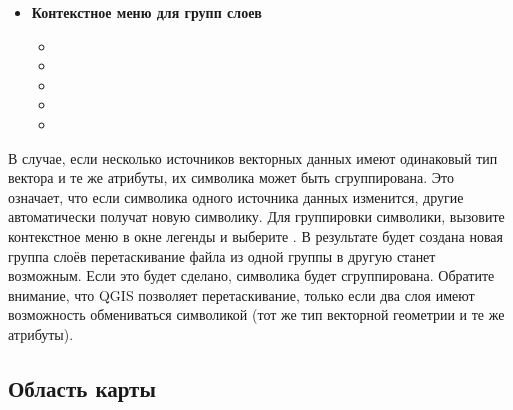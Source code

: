 \begin{itemize}
\item \textbf{Контекстное меню для групп слоев}
\begin{itemize}
\item {}
\item {}
\item {}
\item {}
\item {}
\end{itemize}

\end{itemize}

В случае, если несколько источников векторных данных имеют одинаковый
тип вектора и те же атрибуты, их символика может быть сгруппирована.
Это означает, что если символика одного источника данных изменится,
другие автоматически получат новую символику. Для группировки символики,
вызовите контекстное меню в окне легенды и выберите
. В результате будет создана новая группа слоёв
перетаскивание файла из одной группы в другую станет возможным. Если это будет
сделано, символика будет сгруппирована. Обратите внимание, что QGIS
позволяет перетаскивание, только если два слоя имеют возможность
обмениваться символикой (тот же тип векторной геометрии и те же атрибуты).

%

\subsection{Область карты}\label{label_mapview}

